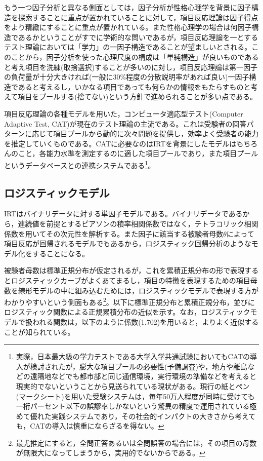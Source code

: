 \documentclass[
  a4paper,
]{ltjsbook}
\begin{document}
もう一つ因子分析と異なる側面としては，因子分析が性格心理学を背景に因子構造を探索することに重点が置かれていることに対して，項目反応理論は因子得点をより精緻にすることに重点が置かれている。また性格心理学の場合は何因子構造であるかということがすでに学術的な問いであるが，項目反応理論を一とするテスト理論においては「学力」の一因子構造であることが望ましいとされる。このことから，因子分析を使った心理尺度の構成は「単純構造」が良いものであると考え項目を洗練(取捨選択)することが多いのに対し，項目反応理論は第一因子の負荷量が十分大きければ(一般に30\%程度の分散説明率があれば良い)一因子構造であると考えるし，いかなる項目であっても何らかの情報をもたらすものと考えて項目をプールする(捨てない)という方針で進められることが多い点である。

項目反応理論の各種モデルを用いた，コンピュータ適応型テスト(Computer
Adaptive Test,
CAT)が現在のテスト理論の主流である。これは受験者の回答パターンに応じて項目プールから動的に次々問題を提供し，効率よく受験者の能力を推定していくものである。CATに必要なのはIRTを背景にしたモデルはもちろんのこと，各能力水準を測定するのに適した項目プールであり，また項目プールというデータベースとの連携システムである\footnote{実際，日本最大級の学力テストである大学入学共通試験においてもCATの導入が検討されたが，膨大な項目プールの必要性(予備調査)や，地方や離島などの遠隔地などでも都市部と同じ通信環境，実行環境の準備などを考えると現実的でないということから見送られている現状がある。現行の紙とペン(マークシート)を用いた受験システムは，毎年50万人程度が同時に受けても一桁パーセント以下の誤謬率しかないという驚異の精度で運用されている極めて優れた実践システムであり，その社会的インパクトの大きさから考えても，CATの導入は慎重にならざるを得ない。}。

\subsection{ロジスティックモデル}\label{ux30edux30b8ux30b9ux30c6ux30a3ux30c3ux30afux30e2ux30c7ux30eb}

IRTはバイナリデータに対する単因子モデルである。バイナリデータであるから，連続値を前提とするピアソンの積率相関係数ではなく，テトラコリック相関係数を用いてその次元性を解析する。また因子に該当する被験者母数\(\theta\)によって項目反応が回帰されるモデルでもあるから，ロジスティック回帰分析のようなモデル化をすることになる。

被験者母数は標準正規分布が仮定されるが，これを累積正規分布の形で表現するとロジスティックカーブがよくあてまるし，項目の特徴を表現するための項目母数を線形モデルの中に組み込むためには，ロジスティックモデルで表現する方がわかりやすいという側面もある\footnote{最尤推定にすると，全問正答あるいは全問誤答の場合には，その項目の母数が無限大になってしまうから，実用的でないからである。}。以下に標準正規分布と累積正規分布，並びにロジスティック関数による正規累積分布の近似を示す。なお，ロジスティックモデルで扱われる関数は，以下のように係数(1.702)を用いると，よりよく近似することが知られている。
\end{document}
